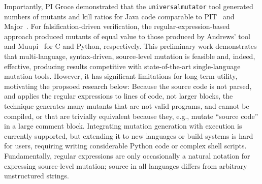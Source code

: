 Importantly,  PI Groce demonstrated that the {\tt universalmutator} tool generated
numbers of mutants and kill ratios for Java code comparable to
PIT~\cite{pittest} and Major~\cite{Major}.  For falsification-driven
verification, the regular-expression-based approach produced mutants of equal
value to those produced by Andrews' tool~\cite{mutant} and Muupi~\cite{muupi}
for C and Python, respectively.  
%
%
%
This preliminary work demonstrates that multi-language, syntax-driven, source-level mutation is
feasible and, indeed, effective, producing results competitive with
state-of-the-art single-language mutation tools.  
However, it has significant limitations for long-term utility, motivating the
propsoed research below: Because the source
code is not parsed, and applies the regular expressions to lines of code, not
larger blocks, the technique generates many mutants that are not valid programs,
and cannot be compiled, or that are trivially equivalent because they, e.g.,
mutate ``source code'' in a large comment block.  Integrating mutation
generation with execution is currently supported, but extending it to new
languages or build systems is hard for users, requiring writing considerable
Python code or complex shell scripts.  
Fundamentally, regular expressions are
only occasionally a natural notation for expressing source-level mutation;
source in all languages differs from arbitrary unstructured strings.


